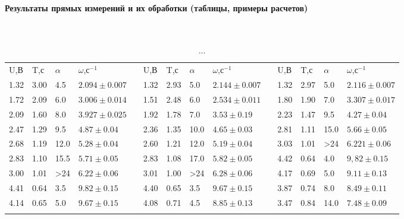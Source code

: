 \documentclass[a4paper]{article}
\begin{document}
		\paragraph{Результаты прямых измерений и их обработки (таблицы, примеры расчетов)}$ $\\
		\begin{table}[h!]
			\centering
			\caption{...}
			\begin{tabular}{| m{1.5em} | m{2em} | m{1.5em} |  m{3em} | m{1.5em} | m{1.5em} | m{2em} | m{1.5em} | m{3em}| m{1.5em} | m{1.5em} | m{2em} | m{1.5em}| m{3em} |}
				\hhline{----~----~----}
				U,В & T,с & $\alpha$ & $\omega$,с$^{-1}$ & & U,В & T,с & $\alpha$ & $\omega$,с$^{-1}$ & & U,В & T,с & $\alpha$ & $\omega$,с$^{-1}$\\
				\hhline{----~----~----}
				1.32 &	3.00 &	4.5 & $2.094 \pm 0.007$ & & 1.32 & 2.93 &	5.0 &	$2.144 \pm 0.007$ & & 1.32 & 2.97 & 5.0 & $2.116 \pm 0.007$ \\
				\hhline{----~----~----}
				1.72 &	2.09 &	6.0	& $3.006 \pm 0.014$ & &	1.51 &	2.48 &	6.0	& $2.534 \pm 0.011$ & &	1.80 &	1.90 &	7.0 &	$3.307 \pm 0.017$
				\\
				\hhline{----~----~----}
				2.09 &	1.60 &	8.0 &	$3.927 \pm 0.025$ & &	1.92 &	1.78 &	7.0 &	$3.53 \pm 0.19$ &	 & 2.23 &	1.47 &	9.5 &	$ 4.27 \pm  0.04$
				\\
				\hhline{----~----~----}
				2.47 &	1.29 &	9.5 &	$4.87 \pm 0.04$ & &	2.36 &	1.35 &	10.0 &	$4.65 \pm 0.03$ & &	2.81 &	1.11 &	15.0 &	$5.66 \pm 0.05 $
				\\
				\hhline{----~----~----}
				2.68 &	1.19 &	12.0 &	$5.28 \pm 0.04$ & &	2.60 &	1.21 &	12.0 &	$5.19 \pm 0.04$ & &	3.03 &	1.01	& >24 &	$6.221 \pm 0.06$
				\\
				\hhline{----~----~----}
				
				2.83 &	1.10 &	15.5 &	$5.71 \pm 0.05$ & &	2.83 & 	1.08	& 17.0 &	$5.82 \pm 0.05$ &	 & 4.42 &	0.64 &	4.0 &	$9,82 \pm 0.15$
				\\
				\hhline{----~----~----}
				
				3.00 &	1.01 &	>24 &	$6.22 \pm 0.06$& &	3.01 &	1.00 &	>24 &	$6.28 \pm 0.06$ &	& 4.17 &	0.69 &	5.0 &	$9.11 \pm 0.13$
				\\
				\hhline{----~----~----}
				
				4.41 &	0.64 &	3.5 &$	9.82 \pm 0.15$ & &	4.40 &	0.65 &	3.5 &	$9.67 \pm 0.15$ & &	3.87 &	0.74 &	8.0 &	$8.49 \pm 0.11$
				\\
				\hhline{----~----~----}
				
				4.14 &	0.65 &	5.0 &	$9.67 \pm 0.15$ & &	4.08 &	0.71 &	4.5 &	$8.85 \pm 0.13$ & &	3.47 &	0.84 &	14.0 &	$7.48 \pm 0.09$
				\\
				\hhline{----~----~----}
				

\end{tabular}
\end{table}
\end{document}
